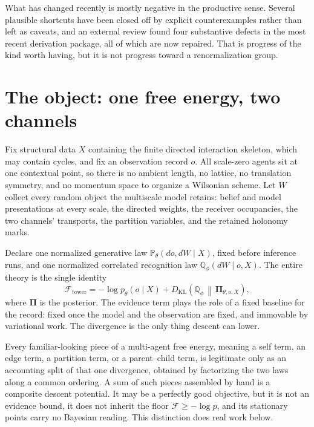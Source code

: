 \documentclass[11pt,letterpaper]{article}
\newcommand{\KL}{D_{\mathrm{KL}}}
\newcommand{\Fen}{\mathcal F}
\begin{document}
What has changed recently is mostly negative in the productive sense. Several
plausible shortcuts have been closed off by explicit counterexamples rather than
left as caveats, and an external review found four substantive defects in the most
recent derivation package, all of which are now repaired. That is progress of the
kind worth having, but it is not progress toward a renormalization group.

\section{The object: one free energy, two channels}

Fix structural data $X$ containing the finite directed interaction skeleton, which
may contain cycles, and fix an observation record $o$. All scale-zero agents sit at
one contextual point, so there is no ambient length, no lattice, no translation
symmetry, and no momentum space to organize a Wilsonian scheme. Let $W$ collect
every random object the multiscale model retains: belief and model presentations at
every scale, the directed weights, the receiver occupancies, the two channels'
transports, the partition variables, and the retained holonomy marks.

Declare one normalized generative law $\mathbb P_\theta(do,dW\mid X)$, fixed before
inference runs, and one normalized correlated recognition law
$\mathbb Q_\phi(dW\mid o,X)$. The entire theory is the single identity
\begin{equation}
\Fen_{\mathrm{tower}}
= -\log p_\theta(o\mid X)
+ \KL\!\left(\mathbb Q_\phi \,\middle\Vert\, \bm\Pi_{\theta,o,X}\right),
\label{eq:vfe}
\end{equation}
where $\bm\Pi$ is the posterior. The evidence term plays the role of a fixed baseline for the
record: fixed once the model and the observation are fixed, and immovable by
variational work. The divergence is the only thing descent can lower.

Every familiar-looking piece of a multi-agent free energy, meaning a self term, an
edge term, a partition term, or a parent--child term, is legitimate only as an
accounting split of that one divergence, obtained by factorizing the two laws along
a common ordering. A sum of such pieces assembled by hand is a composite descent
potential. It may be a perfectly good objective, but it is not an evidence bound, it
does not inherit the floor $\Fen \ge -\log p$, and its stationary points carry no
Bayesian reading. This distinction does real work below.
\end{document}
